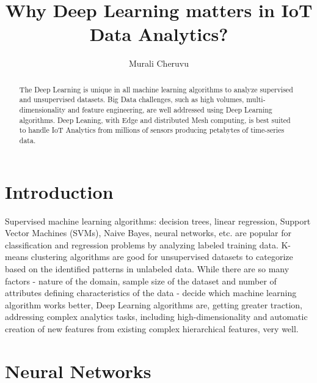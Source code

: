 \documentclass[sigconf]{acmart}
\begin{document}
	\title{Why Deep Learning matters in IoT Data Analytics?}
	
	
	\author{Murali Cheruvu}
	
	\renewcommand{\shortauthors}{M. Cheruvu}
	
	
	\begin{abstract}
		
	The Deep Learning is unique in all machine learning algorithms to analyze supervised and unsupervised datasets. Big Data challenges, such as high volumes, multi-dimensionality and feature engineering, are well addressed using Deep Learning algorithms. Deep Leaning, with Edge and distributed Mesh computing, is best suited to handle IoT Analytics from millions of sensors producing petabytes of time-series data.
			
	\end{abstract}
	
	
	\maketitle

	
	\section{Introduction}		

	Supervised machine learning algorithms: decision trees, linear regression, Support Vector Machines (SVMs), Naive Bayes, neural networks, etc. are popular for classification and regression problems by analyzing labeled training data. K-means clustering algorithms are good for unsupervised datasets to categorize based on the identified patterns in unlabeled data. While there are so many factors - nature of the domain, sample size of the dataset and number of attributes defining characteristics of the data - decide which machine learning algorithm works better, Deep Learning algorithms are, getting greater traction, addressing complex analytics tasks, including high-dimensionality and automatic creation of new features from existing complex hierarchical features, very well. 
		
	\section{Neural Networks}
	
\end{document}
